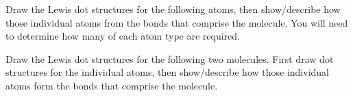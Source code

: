 \documentclass[10pt]{exam}
\begin{document}
\begin{questions}


\question Draw the Lewis dot structures for the following atoms, then
show/describe how those individual atoms from the bonds that comprise
the molecule.  You will need to determine how many of each atom type
are required.


\question Draw the Lewis dot structures for the following two
molecules.  First draw dot structures for the individual atoms, then
show/describe how those individual atoms form the bonds that comprise
the molecule.

\end{questions}
\end{document}
